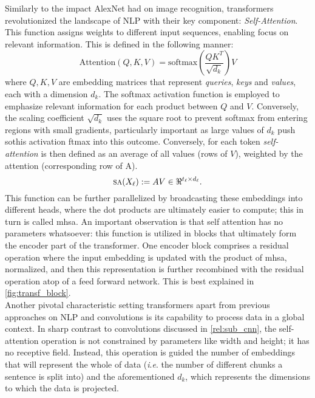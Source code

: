 \noindent Similarly to the impact AlexNet had on image recognition, transformers 
revolutionized the landscape of NLP with their key component: \emph{Self-Attention}. This function 
assigns weights to different input sequences, enabling focus on relevant information. 
This is defined in the following manner:
\begin{equation}
    \mbox{Attention}(Q, K, V) = \mbox{softmax}\left(\frac{QK^T}{\sqrt{d_k}}\right) V
    \label{eq:att}
\end{equation}
\noindent where $Q, K, V$ are embedding matrices that represent \emph{queries}, \emph{keys} and 
\emph{values}, each with a dimension $d_k$. The softmax activation function is employed to 
emphasize relevant information for each product between $Q$ and $V$. Conversely, the scaling 
coefficient $\sqrt{d_k}$ uses the square root to prevent softmax from entering regions with small 
gradients, particularly important as large values of $d_k$ push sothis activation ftmax into this 
outcome. Conversely, for each token \emph{self-attention} is then defined as an average of all 
values (rows of $V$), weighted by the attention (corresponding row of A).
\begin{equation}
	\sa(X_\ell) \defn A V \in \real^{t_\ell \times d_\ell}.
\label{eq:SA}
\end{equation}
This function can be further parallelized by broadcasting these embeddings into different 
heads, where the dot products are ultimately easier to compute; this in turn is called \gls{mhsa}.
An important observation is that self attention has no parameters whatsoever: this function is 
utilized in blocks that ultimately form the encoder part of the transformer. One encoder block 
comprises a residual operation where the input embedding is updated with the product of \gls{mhsa}, 
normalized, and then this representation is further recombined with the residual operation atop of 
a feed forward network. This is best explained in \autoref{fig:transf_block}.\\


\noindent Another pivotal characteristic setting transformers apart from previous approaches on NLP 
and convolutions is its capability to process data in a global context. In sharp contrast to 
convolutions discussed in \autoref{rel:sub_cnn}, the self-attention operation is not constrained by 
parameters like width and height; it has no receptive field. Instead, this operation is guided 
the number of embeddings that will represent the whole of data (\textit{i}.\textit{e}. the number 
of different chunks a sentence is split into) and the aforementioned $d_k$, which represents the 
dimensions to which the data is projected. \\

